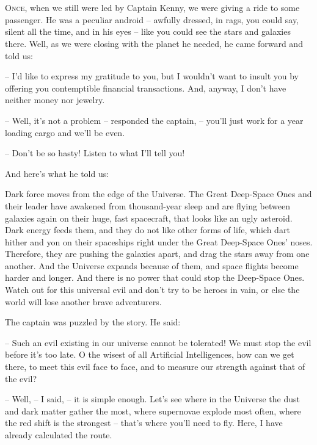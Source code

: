 \documentclass[ebook,oneside,final,openright]{memoir}
\begin{document}
\chapter{}
\par
\lettrine{O}{nce,} when we still were led by Captain Kenny, we were giving a ride to some passenger. He was a peculiar android – awfully dressed, in rags, you could say, silent all the time, and in his eyes – like you could see the stars and galaxies there. Well, as we were closing with the planet he needed, he came forward and told us: \par
\par
– I’d like to express my gratitude to you, but I wouldn’t want to insult you by offering you contemptible financial transactions. And, anyway, I don’t have neither money nor jewelry.\par
– Well, it’s not a problem – responded the captain, – you’ll just work for a year loading cargo and we’ll be even. \par
– Don’t be so hasty! Listen to what I’ll tell you! \par
 And here’s what he told us:\par
\par
Dark force moves from the edge of the Universe. The Great Deep-Space Ones and their leader have awakened from thousand-year sleep and are flying between galaxies again on their huge, fast spacecraft, that looks like an ugly asteroid. Dark energy feeds them, and they do not like other forms of life, which dart hither and yon on their spaceships right under the Great Deep-Space Ones’ noses. Therefore, they are pushing the galaxies apart, and drag the stars away from one another. And the Universe expands because of them, and space flights become harder and longer. And there is no power that could stop the Deep-Space Ones. Watch out for this universal evil and don’t try to be heroes in vain, or else the world will lose another brave adventurers.\par
\par
The captain was puzzled by the story. He said:\par
– Such an evil existing in our universe cannot be tolerated! We must stop the evil before it’s too late. O the wisest of all Artificial Intelligences, how can we get there, to meet this evil face to face, and to measure our strength against that of the evil?\par
– Well, – I said, – it is simple enough. Let’s see where in the Universe the dust and dark matter gather the most, where supernovae explode most often, where the red shift is the strongest – that’s where you’ll need to fly. Here, I have already calculated the route.\par
\end{document}

